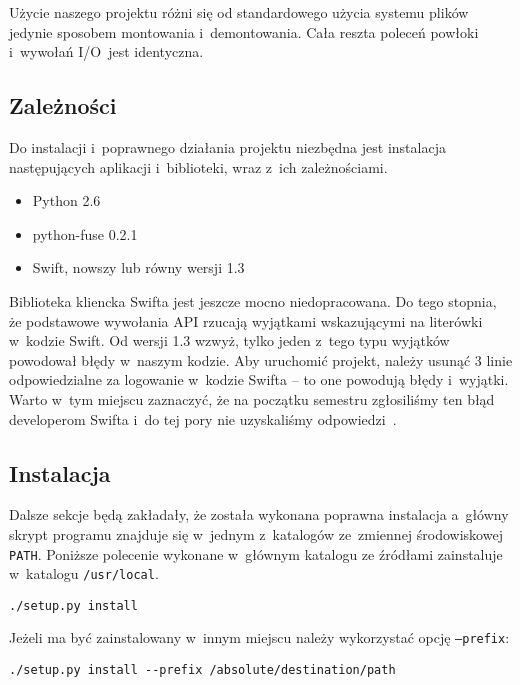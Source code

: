 Użycie naszego projektu różni się od standardowego użycia systemu plików
jedynie sposobem montowania i~demontowania. Cała reszta poleceń powłoki
i~wywołań I/O~jest identyczna.

\subsection{Zależności}\label{sec:zaleznosci}

Do instalacji i~poprawnego działania projektu \cb{} niezbędna jest instalacja
następujących aplikacji i~biblioteki, wraz z~ich zależnościami.

\begin{itemize}
	\item{Python 2.6}
	\item{python-fuse 0.2.1}
	\item{Swift, nowszy lub równy wersji 1.3}
\end{itemize}

Biblioteka kliencka Swifta jest jeszcze mocno niedopracowana. Do tego stopnia,
że podstawowe wywołania API rzucają wyjątkami wskazującymi na literówki
w~kodzie Swift. Od wersji 1.3 wzwyż, tylko jeden z~tego typu wyjątków 
powodował błędy w~naszym kodzie. Aby uruchomić projekt, należy usunąć 3
linie odpowiedzialne za logowanie w~kodzie Swifta -- to one powodują błędy
i~wyjątki. Warto w~tym miejscu zaznaczyć, że na początku semestru zgłosiliśmy
ten błąd developerom Swifta i~do tej pory nie uzyskaliśmy
odpowiedzi~\cite{launchpad-bug}.

\subsection{Instalacja}

Dalsze sekcje będą zakładały, że została wykonana poprawna instalacja a~główny
skrypt programu znajduje się w~jednym z~katalogów ze~zmiennej środowiskowej
\texttt{PATH}. Poniższe polecenie wykonane w~głównym katalogu ze źródłami
zainstaluje \cb{} w~katalogu \texttt{/usr/local}.

\begin{verbatim}
./setup.py install
\end{verbatim}

Jeżeli \cb{} ma być zainstalowany w~innym miejscu należy wykorzystać opcję
\texttt{--prefix}:

\begin{verbatim}
./setup.py install --prefix /absolute/destination/path
\end{verbatim}

